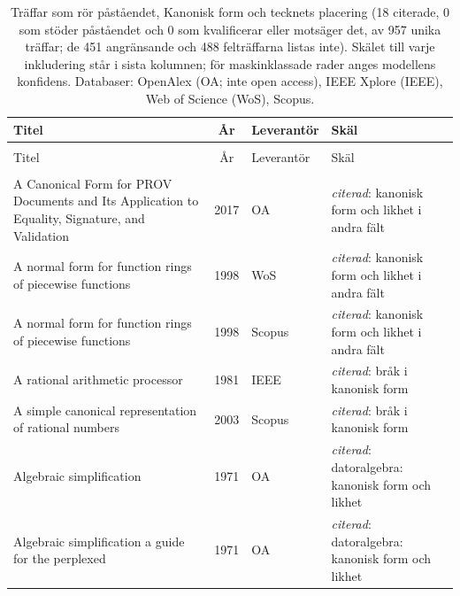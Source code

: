 
\begingroup\footnotesize
\begin{longtable}{@{}%
  >{\raggedright\arraybackslash}p{}c%
  >{\raggedright\arraybackslash}p{}%
  >{\raggedright\arraybackslash}p{}@{}}
\caption{Träffar som rör påståendet, Kanonisk form och tecknets placering (18 citerade, 0 som stöder påståendet och 0 som kvalificerar eller motsäger det, av 957 unika träffar; de 451 angränsande och 488 felträffarna listas inte). Skälet till varje inkludering står i sista kolumnen; för maskinklassade rader anges modellens konfidens. Databaser: OpenAlex (OA; inte open access), IEEE Xplore (IEEE), Web of Science (WoS), Scopus.}\label{tab:sok-kanonisk}\\
\toprule
Titel & År & Leverantör & Skäl \\
\midrule
\endfirsthead
\multicolumn{4}{@{}l}{\emph{\tablename~\thetable{} (forts.)}}\\
\toprule
Titel & År & Leverantör & Skäl \\
\midrule
\endhead
\midrule \multicolumn{4}{r@{}}{\emph{forts.\ på nästa sida}}\\
\endfoot
\bottomrule
\endlastfoot
A Canonical Form for PROV Documents and Its Application to Equality, Signature, and Validation & 2017 & OA & \emph{citerad}: kanonisk form och likhet i andra fält \\
A normal form for function rings of piecewise functions & 1998 & WoS & \emph{citerad}: kanonisk form och likhet i andra fält \\
A normal form for function rings of piecewise functions & 1998 & Scopus & \emph{citerad}: kanonisk form och likhet i andra fält \\
A rational arithmetic processor & 1981 & IEEE & \emph{citerad}: bråk i kanonisk form \\
A simple canonical representation of rational numbers & 2003 & Scopus & \emph{citerad}: bråk i kanonisk form \\
Algebraic simplification & 1971 & OA & \emph{citerad}: datoralgebra: kanonisk form och likhet \\
Algebraic simplification a guide for the perplexed & 1971 & OA & \emph{citerad}: datoralgebra: kanonisk form och likhet \\

\end{longtable}
